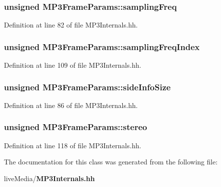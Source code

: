 \subsubsection[{sampling\+Freq}]{\setlength{\rightskip}{0pt plus 5cm}unsigned M\+P3\+Frame\+Params\+::sampling\+Freq}\label{classMP3FrameParams_afcc6164a19e049eaddff5f54ea3d2c44}


Definition at line 82 of file M\+P3\+Internals.\+hh.

\subsubsection[{sampling\+Freq\+Index}]{\setlength{\rightskip}{0pt plus 5cm}unsigned M\+P3\+Frame\+Params\+::sampling\+Freq\+Index\hspace{0.3cm}{\ttfamily [private]}}\label{classMP3FrameParams_a337e2bcfe793665d408fa053877a2b5e}


Definition at line 109 of file M\+P3\+Internals.\+hh.

\subsubsection[{side\+Info\+Size}]{\setlength{\rightskip}{0pt plus 5cm}unsigned M\+P3\+Frame\+Params\+::side\+Info\+Size}\label{classMP3FrameParams_a01b5417c715cc4ff46ff3b715239e633}


Definition at line 86 of file M\+P3\+Internals.\+hh.

\subsubsection[{stereo}]{\setlength{\rightskip}{0pt plus 5cm}unsigned M\+P3\+Frame\+Params\+::stereo\hspace{0.3cm}{\ttfamily [private]}}\label{classMP3FrameParams_a53e7771d49f16bda33ae3322c623bef9}


Definition at line 118 of file M\+P3\+Internals.\+hh.



The documentation for this class was generated from the following file\+:\begin{DoxyCompactItemize}
\item 
live\+Media/{\bf M\+P3\+Internals.\+hh}\end{DoxyCompactItemize}
